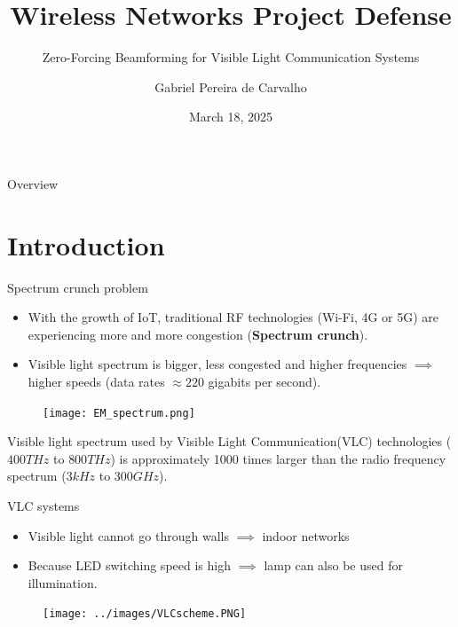 \documentclass[aspectratio=169,xcolor=dvipsnames]{beamer}
\title{Wireless Networks Project Defense}
\subtitle{Zero-Forcing Beamforming for Visible Light Communication Systems}
\author{Gabriel Pereira de Carvalho}
\institute
{
	Ecole polytechnique
}
\date{March 18, 2025} %
\begin{document}
	
	\begin{frame}
		\titlepage
	\end{frame}
	
	\begin{frame}{Overview}
		\tableofcontents
	\end{frame}
	
	\section{Introduction}
	
	\begin{frame}{Spectrum crunch problem}
		\begin{itemize}
			\item With the growth of IoT, traditional RF technologies (Wi-Fi, 4G or 5G) are experiencing more and more congestion (\textbf{Spectrum crunch}).
			\item Visible light spectrum is bigger, less congested and higher frequencies $\implies$ higher speeds (data rates $\approx 220$ gigabits per second).
		\end{itemize}
		\begin{figure}
			\centering
			\texttt{[image: EM\_spectrum.png]}
		\end{figure}
		\begin{block}{}
			Visible light spectrum used by Visible Light Communication(VLC) technologies ($400 THz$ to $800 THz$) is approximately 1000 times larger than the radio frequency spectrum ($3kHz$ to $300GHz$).
		\end{block}
	\end{frame}
	
	\begin{frame}{VLC systems}
		\begin{itemize}
			\item Visible light cannot go through walls $\implies$ indoor networks
			\item Because LED switching speed is high $\implies$ lamp can also be used for illumination.
		\end{itemize}
		\begin{figure}[h!]
			\centering
			\texttt{[image: ../images/VLCscheme.PNG]}
			\caption{}
		\end{figure}
	\end{frame}
	
\end{document}
